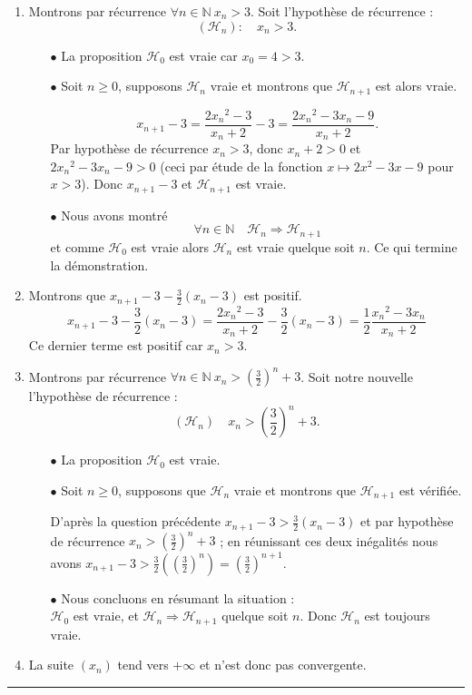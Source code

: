 \documentclass[11pt,a4paper]{article}
\newcommand{\Nn}{\mathbb{N}} \newcommand{\N}{\mathbb{N}}
\newcommand{\fincorrection}{\vspace{1mm}\hrule\vspace*{7mm}}
\begin{document}
\begin{enumerate}
    \item Montrons par r\'ecurrence $\forall n \in \Nn\  x_n > 3$.
Soit l'hypoth\`ese de r\'ecurrence :
$$(\mathcal{H}_n) : \quad x_n >3.$$

\begin{itemize}
    \item[$\bullet$] La proposition $\mathcal{H}_0$ est vraie car $x_0 = 4 > 3$.

    \item[$\bullet$] Soit $n\geq 0$, supposons $\mathcal{H}_n$ vraie et montrons
que $\mathcal{H}_{n+1}$ est alors vraie.

$$x_{n+1}-3 = \frac{2{x_n}^2-3}{x_n+2}-3 = \frac{2{x_n}^2-3x_n-9}{x_n+2}.$$
Par hypoth\`ese de r\'ecurrence $x_n > 3$, donc $x_n+2 > 0$ et
$2{x_n}^2-3x_n-9>0$ (ceci par \'etude de la fonction $x \mapsto
2{x}^2-3x-9$ pour $x>3$). Donc $x_{n+1}-3 $ et $\mathcal{H}_{n+1}$
est vraie.

    \item[$\bullet$] Nous avons montré
$$\forall n \in \Nn \quad \mathcal{H}_{n} \Rightarrow \mathcal{H}_{n+1}$$
et comme $\mathcal{H}_{0}$ est vraie alors $\mathcal{H}_{n}$ est
vraie quelque soit $n$. Ce qui termine la d\'emonstration.
\end{itemize}

    \item Montrons que  $x_{n+1}-3 - \frac{3}{2}(x_n-3)$ est positif.
$$x_{n+1}-3 - \frac{3}{2}(x_n-3) =
\frac{2{x_n}^2-3}{x_n+2}-\frac{3}{2}(x_n-3) =
\frac{1}{2}\frac{{x_n}^2-3x_n}{x_n+2}$$ Ce dernier terme est
positif car $x_n >3$.

    \item
 Montrons par r\'ecurrence $\forall n \in \Nn\  x_n > \left(\frac{3}{2}\right)^n+3$.
Soit notre nouvelle l'hypoth\`ese de r\'ecurrence :
$$(\mathcal{H}_n) \quad x_n >\left( \frac{3}{2}\right)^n+3.$$

\begin{itemize}
    \item[$\bullet$] La proposition $\mathcal{H}_0$ est vraie.

    \item[$\bullet$] Soit $n\geq 0$, supposons que $\mathcal{H}_n$ vraie et montrons
que $\mathcal{H}_{n+1}$ est v\'erifi\'ee.

D'apr\`es la question pr\'ec\'edente $ x_{n+1}-3 >
\frac{3}{2}(x_n-3)$ et par hypoth\`ese de r\'ecurrence $x_n
>\left( \frac{3}{2}\right)^n+3$ ; en r\'eunissant ces deux
in\'egalit\'es nous avons $ x_{n+1}-3 >
\frac{3}{2}(\left(\frac{3}{2}\right)^n) =
\left(\frac{3}{2}\right)^{n+1}$.

    \item[$\bullet$] Nous concluons en r\'esumant la situation :\\
$\mathcal{H}_{0}$ est vraie, et $\mathcal{H}_{n} \Rightarrow
\mathcal{H}_{n+1}$ quelque soit $n$. Donc $\mathcal{H}_{n}$ est
toujours vraie.
\end{itemize}
    \item La suite $(x_n)$ tend vers $+\infty$ et n'est donc pas convergente.
\end{enumerate}
\fincorrection
\end{document}
